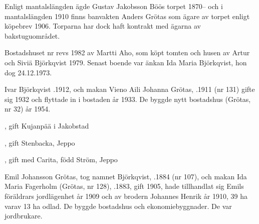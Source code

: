 Enligt  mantalslängden ägde Gustav Jakobsson Böös torpet 1870-- och i mantalslängden 1910 finns banvakten Anders Grötas som ägare av torpet enligt köpebrev 1906. Torparna har dock haft kontrakt med ägarna av bakstuguområdet.



%



%
Bostadshuset nr  revs 1982 av Martti Aho, som köpt tomten och husen av Artur och Siviä Björkqvist 1979. Senast boende var änkan Ida Maria Björkqvist, hon dog 24.12.1973.\jhvspace{}


%
Ivar Björkqvist .1912, och makan Vieno Aili Johanna Grötas, .1911 (nr 131) gifte sig 1932 och flyttade in i bostaden år 1933. De byggde nytt bostadshus (Grötas, nr 32) år 1954.
\begin{jhchildren}
  \item {}, gift Kujanpää i Jakobstad
  \item {}, gift Stenbacka, Jeppo
  \item {}, gift med Carita, född Ström, Jeppo
\end{jhchildren}


%
Emil Johansson Grötas, tog namnet Björkqvist, .1884 (nr 107), och makan Ida Maria Fagerholm (Grötas, nr 128), .1883, gift 1905, hade tillhandlat sig Emils föräldrars jordlägenhet år 1909 och av brodern Johannes Henrik år 1910, 39 ha varav 13 ha odlad. De byggde bostadshus och ekonomiebyggnader. De var jordbrukare.

